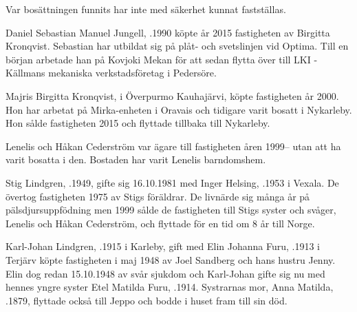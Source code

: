 Var bosättningen funnits har inte med säkerhet kunnat fastställas.



%



%
Daniel Sebastian Manuel Jungell, .1990 köpte år 2015 fastigheten av Birgitta Kronqvist. Sebastian har utbildat sig på plåt- och svetslinjen vid Optima. Till en början arbetade han på Kovjoki Mekan för att sedan flytta över till LKI -Källmans mekaniska verkstadsföretag i Pedersöre.


%
Majris Birgitta Kronqvist,  i Överpurmo Kauhajärvi, köpte fastigheten år 2000. Hon har arbetat på Mirka-enheten i Oravais och tidigare varit bosatt i Nykarleby. Hon sålde fastigheten 2015 och flyttade tillbaka till Nykarleby.\jhvspace{}


%
Lenelis och Håkan Cederström var ägare till fastigheten åren 1999-- utan att ha varit bosatta i den. Bostaden har varit Lenelis barndomshem.\jhvspace{}


%
Stig Lindgren, .1949, gifte sig 16.10.1981 med Inger Helsing, .1953 i Vexala. De övertog fastigheten 1975 av Stigs föräldrar. De livnärde sig många år på pälsdjursuppfödning men 1999 sålde de fastigheten  till Stigs syster och svåger, Lenelis och Håkan Cederström, och flyttade för en tid om 8 år till Norge.



%
Karl-Johan Lindgren, .1915 i Karleby,  gift med Elin Johanna Furu, .1913 i Terjärv köpte fastigheten i maj 1948 av Joel Sandberg och hans hustru Jenny. Elin dog redan 15.10.1948 av svår sjukdom och Karl-Johan gifte sig nu med hennes yngre syster Etel Matilda Furu, .1914. Systrarnas mor, Anna Matilda, .1879, flyttade också till Jeppo och bodde i huset fram till sin död.

